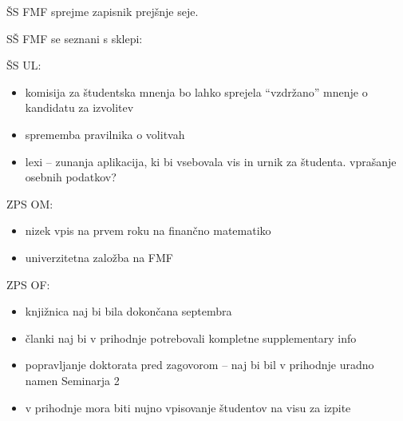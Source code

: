 \documentclass{seja}
\begin{document}
  
  \begin{ad}

    \item

    \begin{sklep*}

      ŠS FMF sprejme zapisnik prejšnje seje.

    \end{sklep*}

    
    \item

    SŠ FMF se seznani s sklepi:

    
    ŠS UL:

    \begin{itemize}

      \item komisija za študentska mnenja bo lahko sprejela ``vzdržano'' mnenje o kandidatu za 
      izvolitev

      \item sprememba pravilnika o volitvah

      \item lexi -- zunanja aplikacija, ki bi vsebovala vis in urnik za študenta. vprašanje osebnih 
      podatkov?

    \end{itemize}

    ZPS OM:

    \begin{itemize}

      \item nizek vpis na prvem roku na finančno matematiko

      \item univerzitetna založba na FMF

    \end{itemize}

    ZPS OF:

    \begin{itemize}

      \item knjižnica naj bi bila dokončana septembra

      \item članki naj bi v prihodnje potrebovali kompletne supplementary info

      \item popravljanje doktorata pred zagovorom -- naj bi bil v prihodnje uradno namen Seminarja 
      2

      \item v prihodnje mora biti nujno vpisovanje študentov na visu za izpite


\end{itemize}
\end{ad}
\end{document}
